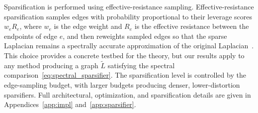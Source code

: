 \documentclass{article}
\begin{document}
Sparsification is performed using effective-resistance sampling. Effective-resistance sparsification samples edges with probability proportional to their leverage scores $w_e R_e$, where $w_e$ is the edge weight and $R_e$ is the effective resistance between the endpoints of edge $e$, and then reweights sampled edges so that the sparse Laplacian remains a spectrally accurate approximation of the original Laplacian~\citep{spielman2011graph,spielman2011spectral}.
This choice provides a concrete testbed for the theory, but our results apply to any method producing a graph $\widetilde L$ satisfying the spectral comparison~\eqref{eq:spectral_sparsifier}. The sparsification level is controlled by the edge-sampling budget, with larger budgets producing denser, lower-distortion sparsifiers. Full architectural, optimization, and sparsification details are given in Appendices~\ref{app:impl} and~\ref{app:sparsifier}.



\end{document}

